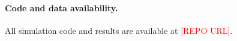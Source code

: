 \documentclass[11pt]{article}
\begin{document}
\paragraph{Code and data availability.}
All simulation code and results are available at \textcolor{red}{[REPO URL]}.


% 
\end{document}
